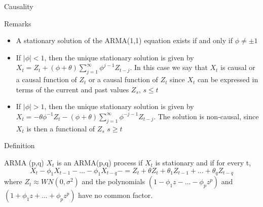 \documentclass[11pt]{beamer}
\begin{document}
\begin{frame}{Causality \cite{brockwell2002introduction}}
\begin{block}{Remarks}
\begin{itemize}
\item A stationary solution of the ARMA(1,1) equation exists if and only if $\phi \neq \pm 1$
\item If $|\phi| < 1$, then the unique stationary solution is given by $X_{t}=Z_{t}+(\phi+\theta)\sum^{\infty}_{j=1}\phi^{j-1}Z_{t-j}$. In this case we say that $X_{t}$ is causal or a causal function of ${Z_{t}}$ or a causal function of ${Z_{t}}$ since $X_{t}$ can be expressed in terms of the current and past values $Z_{s}$, $s\leq t$
\item If $|\phi| >1$, then the unique stationary solution is given by $X_{t}=-\theta\phi^{-1}Z_{t}-(\phi+\theta)\sum^{\infty}_{j=1}\phi^{-j-1}Z_{t-j}$. The solution is non-causal, since $X_{t}$ is then a functional of $Z_{s}$ $s\geq t$
\end{itemize}
\end{block}
\end{frame}


\begin{frame}{Definition \cite{brockwell2002introduction}}
\begin{alertblock}{ARMA (p,q)}
${X_{t}}$ is an ARMA(p,q) process if ${X_{t}}$ is stationary and if for every t, 
\begin{equation*}
X_{t}-\phi_{1} X_{t-1}-...-\phi_{1} X_{t-q}-=Z_{t}+\theta Z_{t}+\theta_{1}Z_{t-1}+...+\theta_{q}Z_{t-q}
\end{equation*}
where ${Z_{t}} \approx WN(0,\sigma^{2})$ and the polynomials $\left(1-\phi_{1}z-...-\phi_{p}z^{p}\right)$ and $\left(1+\phi_{1}z+...+\phi_{p}z^{p}\right)$ have no common factor. 
\end{alertblock}
\end{frame}
\end{document}
